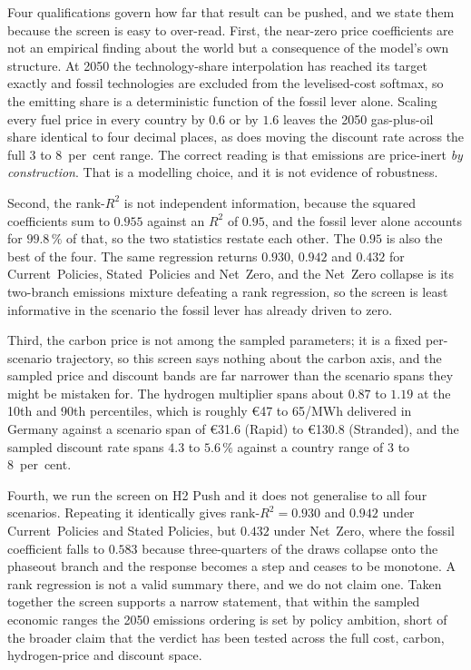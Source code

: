 Four qualifications govern how far that result can be pushed, and we state them
because the screen is easy to over-read. First, the near-zero price coefficients are
not an empirical finding about the world but a consequence of the model's own
structure. At 2050 the technology-share interpolation has reached its target exactly
and fossil technologies are excluded from the levelised-cost softmax, so the emitting
share is a deterministic function of the fossil lever alone. Scaling every fuel price
in every country by $0.6$ or by $1.6$ leaves the 2050 gas-plus-oil share identical to
four decimal places, as does moving the discount rate across the full 3 to 8~per~cent
range. The correct reading is that emissions are price-inert \emph{by construction}. That is a
modelling choice, and it is not evidence of robustness.

Second, the rank-$R^2$ is not independent information, because the squared coefficients
sum to $0.955$ against an $R^2$ of $0.95$, and the fossil lever alone accounts for
$99.8\,\%$ of that, so the two statistics restate each other. The $0.95$ is also the
best of the four. The same regression returns $0.930$, $0.942$ and $0.432$ for
Current~Policies, Stated~Policies and Net~Zero, and the Net~Zero collapse is its
two-branch emissions mixture defeating a rank regression, so the
screen is least informative in the scenario the fossil lever has already driven to zero.

Third, the carbon price
is not among the sampled parameters; it is a fixed per-scenario trajectory, so
this screen says nothing about the carbon axis, and the sampled price and discount
bands are far narrower than the scenario spans they might be mistaken for. The
hydrogen multiplier spans about $0.87$ to $1.19$ at the 10th and 90th percentiles,
which is roughly \euro{}47 to 65/MWh delivered in Germany against a scenario span of
\euro{}31.6 (Rapid) to \euro{}130.8 (Stranded), and the sampled discount rate spans
$4.3$ to $5.6\,\%$ against a country range of 3 to 8~per~cent.

Fourth, we run the screen on H2 Push and it does not generalise to all four scenarios. Repeating it
identically gives rank-$R^2 = 0.930$ and $0.942$ under Current~Policies and Stated
Policies, but $0.432$ under Net~Zero, where the fossil coefficient falls to $0.583$
because three-quarters of the draws collapse onto the phaseout branch and the response becomes a step and ceases to be monotone. A rank regression is not a valid
summary there, and we do not claim one. Taken together the screen supports a narrow
statement, that within the sampled economic ranges the 2050 emissions ordering is set by policy ambition, short of the broader claim that the verdict has been tested across
the full cost, carbon, hydrogen-price and discount space.

